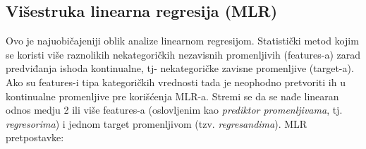 \documentclass[fontsize=12bp, paper=a4]{scrarticle}
\begin{document}
\subsection{Višestruka linearna regresija (MLR)}

Ovo je najuobičajeniji oblik analize linearnom regresijom. Statistički metod kojim se koristi više raznolikih nekategoričkih nezavisnih promenljivih (features-a) zarad predviđanja ishoda kontinualne, tj- nekategoričke zavisne promenljive (target-a). Ako su features-i tipa kategoričkih vrednosti tada je neophodno pretvoriti ih u kontinualne promenljive pre korišćenja MLR-a. Stremi se da se nađe linearan odnos medju 2 ili više features-a (oslovljenim kao \textit{prediktor promenljivama}, tj. \textit{regresorima}) i jednom target promenljivom (tzv. \textit{regresandima}).
MLR pretpostavke:
\end{document}

